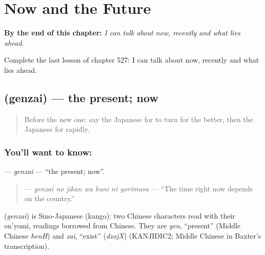 
\chapter{Now and the Future}
\label{ch:ja-now-and-the-future}

\begin{chapteropening}
\textbf{By the end of this chapter:} \emph{I can talk about now, recently and what lies ahead.}

Complete the last lesson of chapter 527: I can talk about now, recently and what lies ahead.
\end{chapteropening}

\section[\texorpdfstring{\ja{げんざい} (genzai)}{げんざい (genzai)}]{ (genzai) — the present; now}

\label{lesson:JA-C527-genzai}



\begin{quote}
Before the new one: say the Japanese for to turn for the better, then the Japanese for rapidly.
\end{quote}

\subsection*{You'll want to know: }
\textbf{} — \emph{genzai} — \textquotedblleft{}the present; now\textquotedblright{}.

\begin{quote}
\textbf{   } — \emph{genzai no jikan wa kuni ni yorimasu} — \textquotedblleft{}The time right now depends on the country.\textquotedblright{}
\end{quote}

\begin{cousinweb}
\textbf{} (\emph{genzai}) is Sino-Japanese (kango): two Chinese characters read with their on'yomi, readings borrowed from Chinese. They are \emph{gen}, \textquotedblleft{}present\textquotedblright{} (Middle Chinese \emph{henH}) and \emph{zai}, \textquotedblleft{}exist\textquotedblright{} (\emph{dzojX}) (KANJIDIC2; Middle Chinese in Baxter's transcription).
\end{cousinweb}


